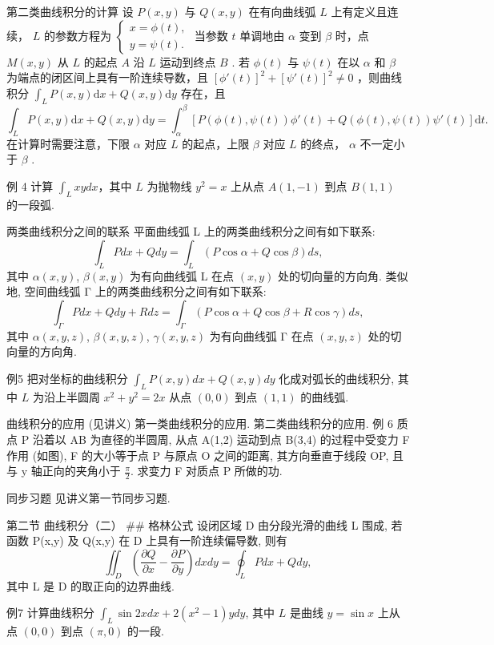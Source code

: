 第二类曲线积分的计算
设 \(P(x,y)\) 与 \(Q(x,y)\) 在有向曲线弧 \(L\) 上有定义且连续， \(L\) 的参数方程为 \(\left\{ \begin{array}{l}x = \phi (t),\\ y = \psi (t). \end{array} \right.\) 当参数 \(t\) 单调地由 \(\alpha\) 变到 \(\beta\) 时，点 \(M(x,y)\) 从 \(L\) 的起点 \(A\) 沿 \(L\) 运动到终点 \(B\) . 若 \(\phi (t)\) 与 \(\psi (t)\) 在以 \(\alpha\) 和 \(\beta\) 为端点的闭区间上具有一阶连续导数，且 \([\phi '(t)]^2 +[\psi '(t)]^2 \neq 0\) ，则曲线积分 \(\int_{L}P(x,y)\mathrm{d}x + Q(x,y)\mathrm{d}y\) 存在，且
\[\int_{L}P(x,y)\mathrm{d}x + Q(x,y)\mathrm{d}y = \int_{\alpha}^{\beta}[P(\phi (t),\psi (t))\phi '(t) + Q(\phi (t),\psi (t))\psi '(t)]\mathrm{d}t.\]
在计算时需要注意，下限 \(\alpha\) 对应 \(L\) 的起点，上限 \(\beta\) 对应 \(L\) 的终点， \(\alpha\) 不一定小于 \(\beta\) .

例 4 计算 \(\int_{L} xydx\)，其中 \(L\) 为抛物线 \(y^2 = x\) 上从点 \(A(1, -1)\) 到点 \(B(1, 1)\) 的一段弧.

两类曲线积分之间的联系
平面曲线弧 L 上的两类曲线积分之间有如下联系:
\[ \int_L Pdx + Qdy = \int_L (P \cos \alpha + Q \cos \beta) ds, \]
其中 \(\alpha(x, y)\), \(\beta(x, y)\) 为有向曲线弧 L 在点 \((x, y)\) 处的切向量的方向角.
类似地, 空间曲线弧 Γ 上的两类曲线积分之间有如下联系:
\[ \int_{\Gamma} Pdx + Qdy + Rdz = \int_{\Gamma} (P \cos \alpha + Q \cos \beta + R \cos \gamma) ds, \]
其中 \(\alpha(x, y, z)\), \(\beta(x, y, z)\), \(\gamma(x, y, z)\) 为有向曲线弧 Γ 在点 \((x, y, z)\) 处的切向量的方向角.

例5 把对坐标的曲线积分 \(\int_{L} P(x, y) dx + Q(x, y) dy\) 化成对弧长的曲线积分, 其中 \(L\) 为沿上半圆周 \(x^2 + y^2 = 2x\) 从点 \((0, 0)\) 到点 \((1, 1)\) 的曲线弧.

曲线积分的应用 (见讲义)
第一类曲线积分的应用.
第二类曲线积分的应用.
例 6
质点 P 沿着以 AB 为直径的半圆周, 从点 A(1,2) 运动到点 B(3,4) 的过程中受变力 F 作用 (如图), F 的大小等于点 P 与原点 O 之间的距离, 其方向垂直于线段 OP, 且与 y 轴正向的夹角小于 \(\frac{\pi}{2}\). 求变力 F 对质点 P 所做的功.

同步习题 见讲义第一节同步习题.

第二节 曲线积分（二）
## 格林公式
设闭区域 D 由分段光滑的曲线 L 围成, 若函数 P(x,y) 及 Q(x,y) 在 D 上具有一阶连续偏导数, 则有
\[ \iint_D \left( \frac{\partial Q}{\partial x} - \frac{\partial P}{\partial y} \right) dxdy = \oint_L Pdx + Qdy, \]
其中 L 是 D 的取正向的边界曲线.

例7 计算曲线积分 \(\int_{L} \sin 2x dx + 2(x^2 - 1) y dy\), 其中 \(L\) 是曲线 \(y = \sin x\) 上从点 \((0, 0)\) 到点 \((\pi, 0)\) 的一段.

